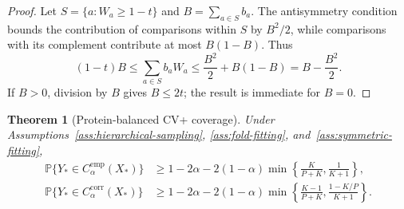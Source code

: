 \documentclass[11pt]{article}
\newtheorem{theorem}{Theorem}
\begin{document}
\begin{proof}
Let $S=\{a:W_a\geq1-t\}$ and $B=\sum_{a\in S}b_a$. The antisymmetry condition bounds the contribution of comparisons within $S$ by $B^2/2$, while comparisons with its complement contribute at most $B(1-B)$. Thus
\[
 (1-t)B\leq\sum_{a\in S}b_aW_a
 \leq\frac{B^2}{2}+B(1-B)=B-\frac{B^2}{2}.
\]
If $B>0$, division by $B$ gives $B\leq2t$; the result is immediate for $B=0$.
\end{proof}

\begin{theorem}[Protein-balanced CV+ coverage]
\label{thm:protein-cvplus}
Under Assumptions~\ref{ass:hierarchical-sampling}, \ref{ass:fold-fitting}, and~\ref{ass:symmetric-fitting},
\begin{align}
 \mathbb P\{Y_*\in C_{\alpha}^{\mathrm{emp}}(X_*)\}
 &\geq1-2\alpha
 -2(1-\alpha)\min\left\{\frac{K}{P+K},\frac1{K+1}\right\},
 \label{eq:combined-empirical-bound}\\
 \mathbb P\{Y_*\in C_{\alpha}^{\mathrm{corr}}(X_*)\}
 &\geq1-2\alpha
 -2(1-\alpha)\min\left\{\frac{K-1}{P+K},
                                \frac{1-K/P}{K+1}\right\}.
 \label{eq:combined-corrected-bound}
\end{align}
\end{theorem}
\end{document}
